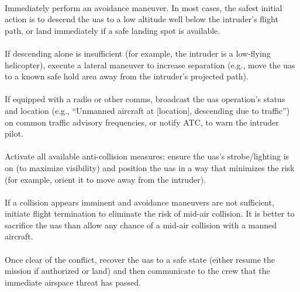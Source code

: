                 \paragraph{} Immediately perform an avoidance maneuver. In most cases, the safest initial action is to descend the \ac{uas} to a low altitude well below the intruder’s flight path, or land immediately if a safe landing spot is available.
                
                \paragraph{} If descending alone is insufficient (for example, the intruder is a low-flying helicopter), execute a lateral maneuver to increase separation (e.g., move the \ac{uas} to a known safe hold area away from the intruder’s projected path).
                
                \paragraph{} If equipped with a radio or other comms, broadcast the \ac{uas} operation’s status and location (e.g., “Unmanned aircraft at [location], descending due to traffic”) on common traffic advisory frequencies, or notify ATC, to warn the intruder pilot.
                
                \paragraph{} Activate all available anti-collision measures: ensure the \ac{uas}’s strobe/lighting is on (to maximize visibility) and position the \ac{uas} in a way that minimizes the risk (for example, orient it to move away from the intruder).
                
                \paragraph{} If a collision appears imminent and avoidance maneuvers are not sufficient, initiate flight termination to eliminate the risk of mid-air collision. It is better to sacrifice the \ac{uas} than allow any chance of a mid-air collision with a manned aircraft.
                
                \paragraph{} Once clear of the conflict, recover the \ac{uas} to a safe state (either resume the mission if authorized or land) and then communicate to the crew that the immediate airspace threat has passed.
 
